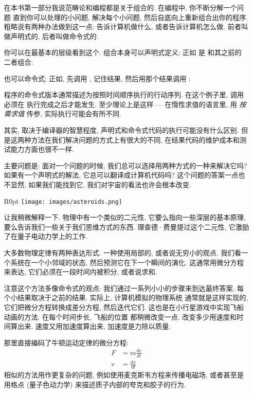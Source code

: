 
\lettrine[lhang=0.17]{在}{本书第一部分}我说范畴论和编程都是关于组合的. 在编程中, 你不断分解一个问题
直到你可以处理的小问题, 解决每个小问题, 然后自底向上重新组合出你的程序. 粗略说有两种办法做到这一点:
告诉计算机做什么, 或者告诉计算机怎么做. 前者叫做声明式的, 后者叫做命令式的.

你可以在最基本的层级看到这个. 组合本身可以声明式定义; 正如  是  和其之前的  二者组合:

也可以命令式; 正如, 先调用 , 记住结果, 然后用那个结果调用 :

程序的命令式版本通常描述为按照时间顺序执行的行动序列. 在这个例子里, 调用  必须在  执行完成之后才能发生.
至少理论上是这样 --- 在惰性求值的语言里, 用 \emph{按需求值} 传参, 实际执行可能会有所不同.

其实, 取决于编译器的智慧程度, 声明式和命令式代码的执行可能没有什么区别. 但是这两种方法在我们解决问题的方式上有很大的不同,
在结果代码的维护成本和测试能力方面也很不一样.

主要问题是: 面对一个问题的时候, 我们总可以选择用两种方式的一种来解决它吗? 如果有一个声明式的解法, 它总可以翻译成计算机代码吗?
这个问题的答案一点也不显然, 如果我们能找到它, 我们对宇宙的看法也许会根本改变.

\begin{wrapfigure}{R}{0pt}
  \texttt{[image: images/asteroids.png]}
\end{wrapfigure}

让我稍微解释一下. 物理中有一个类似的二元性, 它要么指向一些深层的基本原理, 要么告诉我们一些关于我们思维方式的东西.
理查德·费曼提过这个二元性, 它激励了在量子电动力学上的工作.

大多数物理定律有两种表达形式. 一种使用局部的, 或者说无穷小的观点. 我们看一个系统在一个小邻域的状态, 然后预测它在下一个瞬间的演化.
这通常用微分方程来表达, 它们必须在一段时间内被积分, 或者说求和.

注意这个方法多像命令式的观点: 我们通过一系列小小的步骤来到达最终答案, 每个小结果取决于之前的结果. 实际上, 计算机模拟的物理系统
通常就是这样实现的, 它们把微分方程转换成差分方程, 然后迭代它们. 这也是在小行星游戏中实现飞船动画的方法. 在每个时间步长, 飞船的位置
都稍微改变一点. 改变多少用速度和时间算出来. 速度又用加速度算出来, 加速度是力除以质量.

那里直接编码了牛顿运动定律的微分方程:
\begin{align*}
  F & = m \frac{dv}{dt} \\
  v & = \frac{dx}{dt}
\end{align*}
相似的方法用作更复杂的问题, 例如使用麦克斯韦方程来传播电磁场, 或者甚至是用格点  (量子色动力学)
来描述质子内部的夸克和胶子的行为.

